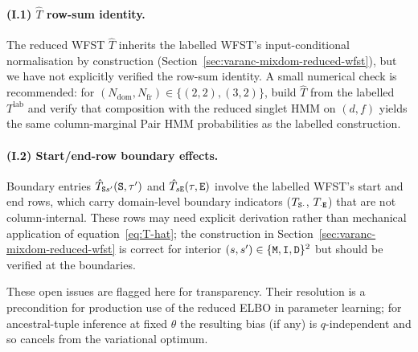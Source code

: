\paragraph{(I.1) $\hat{T}$ row-sum identity.}
The reduced WFST $\hat{T}$ inherits the labelled WFST's
input-conditional normalisation by construction
(Section~\ref{sec:varanc-mixdom-reduced-wfst}), but we have not
explicitly verified the row-sum identity. A small numerical check is
recommended: for $(N_{\text{dom}}, N_{\text{fr}}) \in \{(2, 2),
(3, 2)\}$, build $\hat{T}$ from the labelled $T^{\text{lab}}$ and
verify that composition with the reduced singlet HMM on $(d, f)$
yields the same column-marginal Pair HMM probabilities as the
labelled construction.

\paragraph{(I.2) Start/end-row boundary effects.}
Boundary entries $\hat{T}_{{\tt S} s'}({\tt S}, \tau')$ and
$\hat{T}_{s{\tt E}}(\tau, {\tt E})$ involve the labelled WFST's start and
end rows, which carry domain-level boundary indicators
($T_{{\tt S}\cdot}$, $T_{\cdot{\tt E}}$) that are
not column-internal. These rows may need explicit derivation rather
than mechanical application of equation~\eqref{eq:T-hat}; the
construction in Section~\ref{sec:varanc-mixdom-reduced-wfst} is
correct for interior $(s, s') \in \{{\tt M}, {\tt I}, {\tt D}\}^2$ but should
be verified at the boundaries.

These open issues are flagged here for transparency. Their resolution
is a precondition for production use of the reduced ELBO in
parameter learning; for ancestral-tuple inference at fixed $\theta$
the resulting bias (if any) is $q$-independent and so cancels from
the variational optimum.
